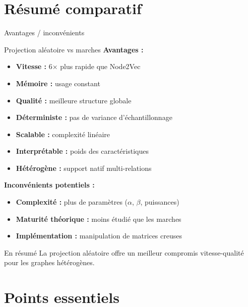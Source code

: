 \documentclass[9pt,aspectratio=169,professionalfonts]{beamer}
\providecommand{\checkmark}{\textbf{✓}}
\begin{document}
\section{Résumé comparatif}

\begin{frame}{Avantages / inconvénients}
\begin{block}{Projection aléatoire vs marches}
\textbf{Avantages :}
\begin{itemize}
    \item[\checkmark] \textbf{Vitesse :} 6× plus rapide que Node2Vec
    \item[\checkmark] \textbf{Mémoire :} usage constant
    \item[\checkmark] \textbf{Qualité :} meilleure structure globale
    \item[\checkmark] \textbf{Déterministe :} pas de variance d'échantillonnage
    \item[\checkmark] \textbf{Scalable :} complexité linéaire
    \item[\checkmark] \textbf{Interprétable :} poids des caractéristiques
    \item[\checkmark] \textbf{Hétérogène :} support natif multi-relations
\end{itemize}

\textbf{Inconvénients potentiels :}
\begin{itemize}
    \item[!] \textbf{Complexité :} plus de paramètres ($\alpha$, $\beta$, puissances)
    \item[!] \textbf{Maturité théorique :} moins étudié que les marches
    \item[!] \textbf{Implémentation :} manipulation de matrices creuses
\end{itemize}
\end{block}

\begin{alertblock}{En résumé}
La projection aléatoire offre un meilleur compromis vitesse-qualité pour les graphes hétérogènes.
\end{alertblock}
\end{frame}

\section{Points essentiels}
\end{document}
